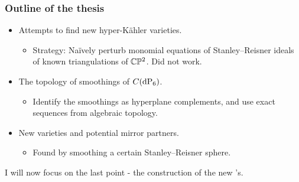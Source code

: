 \begin{frame}
\frametitle{Outline of the thesis}

\begin{itemize}
    \item<1->
    Attempts to find new hyper-Kähler varieties. \pause
    \begin{itemize}
        \item
	Strategy: Naïvely perturb monomial equations of Stanley--Reisner ideals of known triangulations of $\mathbb{C} \mathbb{P}^2$. \alert{Did not work.} \pause
    \end{itemize}

    \item<2->
    The topology of smoothings of $C(\dP6)$. \pause
    \begin{itemize}
        \item
        Identify the smoothings as hyperplane complements, and use exact sequences from algebraic topology. \pause
    \end{itemize}

    \item<3->
    New \CY varieties and potential mirror partners. \pause
    \begin{itemize}
        \item
        Found by smoothing a certain Stanley--Reisner sphere.
    \end{itemize}
\end{itemize}
\pause

I will now focus on the last point - the construction of the new \CY's.

\end{frame}